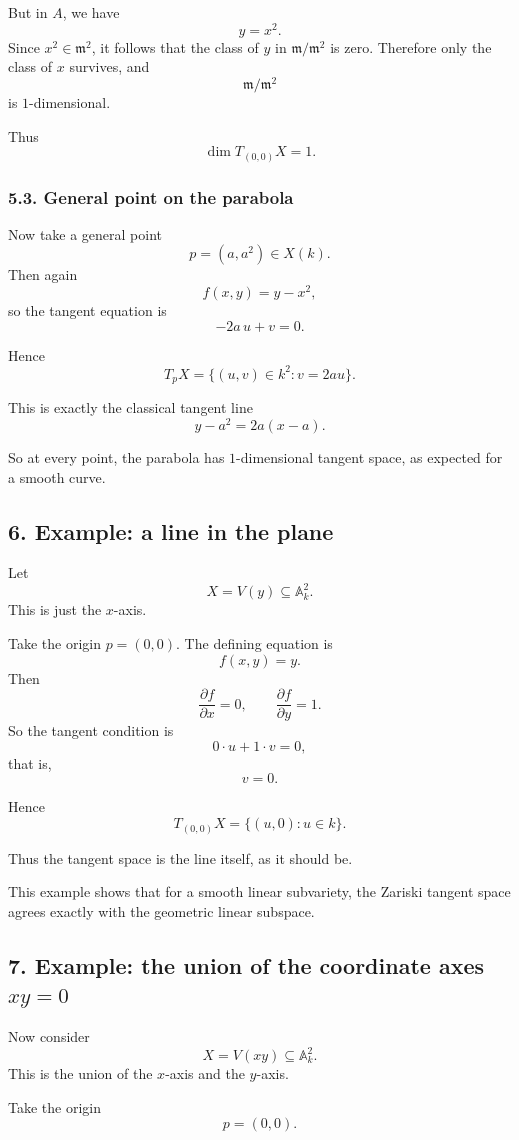 \documentclass[12pt,a4paper]{article}
\theoremstyle{plain}
\theoremstyle{definition}      %
\begin{document}
	But in \(A\), we have
	\[
	y=x^2.
	\]
	Since \(x^2\in \mathfrak m^2\), it follows that the class of \(y\) in \(\mathfrak m/\mathfrak m^2\) is zero. Therefore only the class of \(x\) survives, and
	\[
	\mathfrak m/\mathfrak m^2
	\]
	is \(1\)-dimensional.
	
	Thus
	\[
	\dim T_{(0,0)}X=1.
	\]
	
	\subsubsection*{5.3. General point on the parabola}
	
	Now take a general point
	\[
	p=(a,a^2)\in X(k).
	\]
	Then again
	\[
	f(x,y)=y-x^2,
	\]
	so the tangent equation is
	\[
	-2a\,u+v=0.
	\]
	
	Hence
	\[
	T_pX=\{(u,v)\in k^2:v=2au\}.
	\]
	
	This is exactly the classical tangent line
	\[
	y-a^2=2a(x-a).
	\]
	
	So at every point, the parabola has \(1\)-dimensional tangent space, as expected for a smooth curve.
	
	\subsection*{6. Example: a line in the plane}
	
	Let
	\[
	X=V(y)\subseteq \mathbb A_k^2.
	\]
	This is just the \(x\)-axis.
	
	Take the origin \(p=(0,0)\). The defining equation is
	\[
	f(x,y)=y.
	\]
	Then
	\[
	\frac{\partial f}{\partial x}=0,
	\qquad
	\frac{\partial f}{\partial y}=1.
	\]
	So the tangent condition is
	\[
	0\cdot u+1\cdot v=0,
	\]
	that is,
	\[
	v=0.
	\]
	
	Hence
	\[
	T_{(0,0)}X=\{(u,0):u\in k\}.
	\]
	
	Thus the tangent space is the line itself, as it should be.
	
	This example shows that for a smooth linear subvariety, the Zariski tangent space agrees exactly with the geometric linear subspace.
	
	\subsection*{7. Example: the union of the coordinate axes \(xy=0\)}
	
	Now consider
	\[
	X=V(xy)\subseteq \mathbb A_k^2.
	\]
	This is the union of the \(x\)-axis and the \(y\)-axis.
	
	Take the origin
	\[
	p=(0,0).
	\]
	
\end{document}
